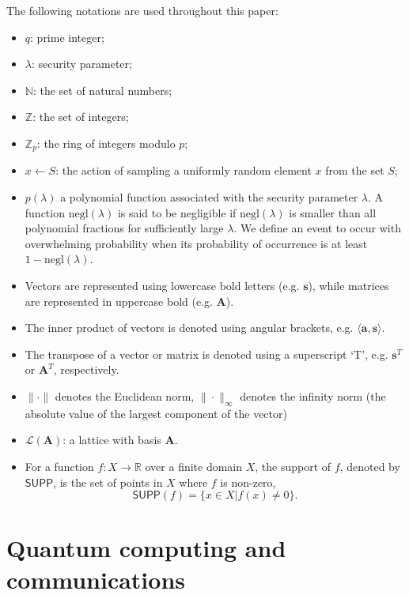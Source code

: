 \documentclass[cryptography,review,submit,pdftex,moreauthors,amsmath,amssymb,aps,strict]{Definitions/mdpi}
\newcommand{\peter}[1]{\textcolor{red}{#1}}
\begin{document}
The following notations are used throughout this paper:
\begin{itemize}
    \item $q$: prime integer;
    \item $\lambda$: security parameter;
    \item $\mathbb{N}$: the set of natural numbers;
    \item $\mathbb{Z}$: the set of integers;
    \item $\mathbb{Z}_p$: the ring of integers modulo $p$;
    \item $x\gets S$: the action of sampling a uniformly random element $x$ from the set $S$;
    \item $p(\lambda)$ a polynomial function associated with the security parameter $\lambda$. A function $\mathrm{negl}(\lambda)$ is said to be negligible if $\mathrm{negl}(\lambda)$ is smaller than all polynomial fractions for sufficiently large $\lambda$. We define an event to occur with overwhelming probability when its probability of occurrence is at least $1-\mathrm{negl}(\lambda)$. 
    \item Vectors are represented using lowercase bold letters (e.g. $\mathbf{s}$), while matrices are represented in uppercase bold (e.g. $\mathbf{A}$). 
    \item The inner product of vectors is denoted using angular brackets, e.g. $\langle\mathbf{a},\mathbf{s}\rangle$.
    \item The transpose of a vector or matrix is denoted using a superscript `T', e.g. $\mathbf{s}^T$ or $\mathbf{A}^T$, respectively.
    \item $\|\cdot\|$ denotes the Euclidean norm, $\|\cdot\|_{\infty}$ denotes the infinity norm (the absolute value of the largest component of the vector)
    \item $\mathcal{L}(\mathbf{A})$: a lattice with basis $\mathbf{A}$.
    \item For a function $f:X\to \mathbb{R}$ over a finite domain $X$, the support of $f$, denoted by $\mathsf{SUPP}$, is the set of points in $X$ where $f$ is non-zero,
    $$\mathsf{SUPP}(f)=\{x\in X|f(x)\neq 0\}.$$
\end{itemize}
\section{Quantum computing and communications} \label{quantum_computing}
\end{document}
